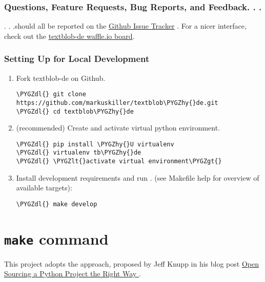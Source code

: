 \documentclass[letterpaper,10pt,english]{sphinxmanual}
\def\PYGZlt{\char`\<}
\def\PYGZgt{\char`\>}
\def\PYGZdl{\char`\$}
\def\PYGZhy{\char`\-}
\begin{document}
\subsubsection{Questions, Feature Requests, Bug Reports, and Feedback. . .}
\label{contributing:questions-feature-requests-bug-reports-and-feedback}
. . .should all be reported on the \href{https://github.com/markuskiller/textblob-de/issues?state=open}{Github Issue Tracker} . For a nicer interface, check out the \href{https://waffle.io/markuskiller/textblob-de}{textblob-de waffle.io board}.


\subsubsection{Setting Up for Local Development}
\label{contributing:setting-up-for-local-development}\label{contributing:github-issue-tracker}\begin{enumerate}
\item {} 
Fork textblob-de on Github.

\begin{Verbatim}[commandchars=\\\{\}]
\PYGZdl{} git clone https://github.com/markuskiller/textblob\PYGZhy{}de.git
\PYGZdl{} cd textblob\PYGZhy{}de
\end{Verbatim}

\item {} 
(recommended) Create and activate virtual python environment.

\begin{Verbatim}[commandchars=\\\{\}]
\PYGZdl{} pip install \PYGZhy{}U virtualenv
\PYGZdl{} virtualenv tb\PYGZhy{}de
\PYGZdl{} \PYGZlt{}activate virtual environment\PYGZgt{}
\end{Verbatim}

\item {} 
Install development requirements and run .
(see Makefile help for overview of available
 targets):

\begin{Verbatim}[commandchars=\\\{\}]
\PYGZdl{} make develop
\end{Verbatim}

\end{enumerate}


\section{\texttt{make} command}
\label{make_info::doc}\label{make_info:make-command}
This project adopts the  approach, proposed by Jeff Knupp in his
blog post \href{http://www.jeffknupp.com/blog/2013/08/16/open-sourcing-a-python-project-the-right-way/}{Open Sourcing a Python Project the Right Way }.
\end{document}
